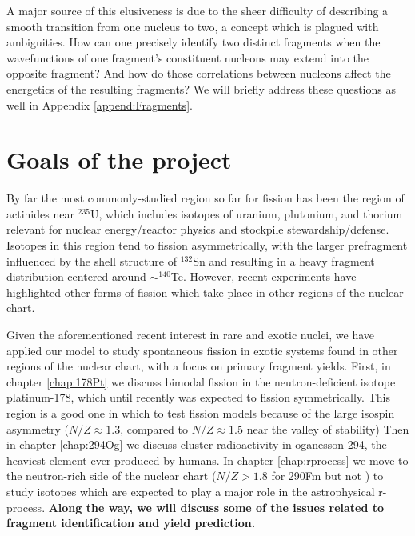 A major source of this elusiveness is due to the sheer difficulty of describing a smooth transition from one nucleus to two, a concept which is plagued with ambiguities. How can one precisely identify two distinct fragments when the wavefunctions of one fragment’s constituent nucleons may extend into the opposite fragment? And how do those correlations between nucleons affect the energetics of the resulting fragments? We will briefly address these questions as well in Appendix \ref{append:Fragments}.


\section{Goals of the project}
By far the most commonly-studied region so far for fission has been the region of actinides near $^{235}$U, which includes isotopes of uranium, plutonium, and thorium relevant for nuclear energy/reactor physics and stockpile stewardship/defense. Isotopes in this region tend to fission asymmetrically, with the larger prefragment influenced by the shell structure of $^{132}$Sn and resulting in a heavy fragment distribution centered around $\sim^{140}$Te. However, recent experiments have highlighted other forms of fission which take place in other regions of the nuclear chart.

Given the aforementioned recent interest in rare and exotic nuclei, we have applied our model to study spontaneous fission in exotic systems found in other regions of the nuclear chart, with a focus on primary fragment yields. First, in chapter \ref{chap:178Pt} we discuss bimodal fission in the neutron-deficient isotope platinum-178, which until recently was expected to fission symmetrically. This region is a good one in which to test fission models because of the large isospin asymmetry ($N/Z\approx1.3$, compared to $N/Z\approx1.5$ near the valley of stability) Then in chapter \ref{chap:294Og} we discuss cluster radioactivity in oganesson-294, the heaviest element ever produced by humans. In chapter \ref{chap:rprocess} we move to the neutron-rich side of the nuclear chart ($N/Z>1.8$ for 290Fm but not {\Cf}) to study isotopes which are expected to play a major role in the astrophysical r-process. \textbf{Along the way, we will discuss some of the issues related to fragment identification and yield prediction.}


